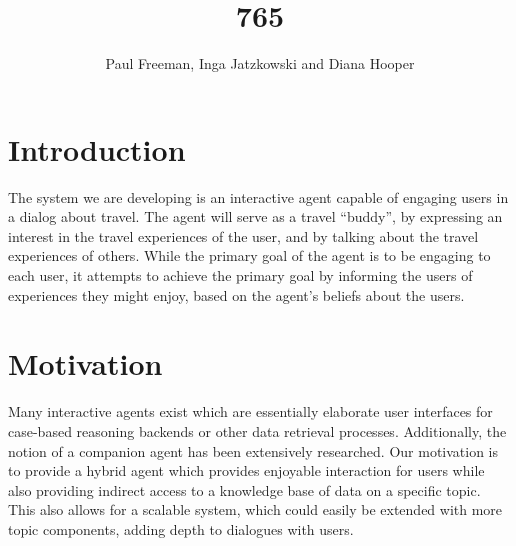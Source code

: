 \documentclass[11pt]{article} %
\title{765}
\author{Paul Freeman, Inga Jatzkowski and Diana Hooper}
\begin{document}
\maketitle
\newpage
\section{Introduction}
The system we are developing is an interactive agent capable of engaging users in a dialog about travel. The agent will serve as a travel “buddy”, by expressing an interest in the travel experiences of the user, and by talking about the travel experiences of others. While the primary goal of the agent is to be engaging to each user, it attempts to achieve the primary goal by informing the users of experiences they might enjoy, based on the agent’s beliefs about the users.

\section{Motivation}
Many interactive agents exist which are essentially elaborate user interfaces for case-based reasoning backends or other data retrieval processes. Additionally, the notion of a companion agent has been extensively researched. Our motivation is to provide a hybrid agent which provides enjoyable interaction for users while also providing indirect access to a knowledge base of data on a specific topic.\\
This also allows for a scalable system, which could easily be extended with more topic components, adding depth to dialogues with users.
\end{document}
